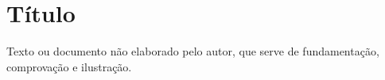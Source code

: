 \chapter{Título}\label{anexo1}

Texto ou documento não elaborado pelo autor, que serve de fundamentação, comprovação e ilustração.